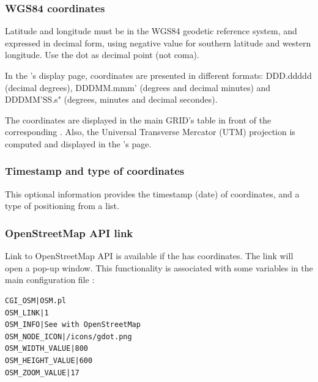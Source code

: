 \subsubsection{WGS84 coordinates}

Latitude and longitude must be in the WGS84 geodetic reference system, and expressed in decimal form, using negative value for southern latitude and western longitude. Use the dot as decimal point (not coma).

In the 's display page, coordinates are presented in different formats: DDD.ddddd (decimal degrees), DDD\degree MM.mmm' (degrees and decimal minutes) and DDD\degree MM'SS.s" (degrees, minutes and decimal secondes).

The coordinates are displayed in the main GRID's table in front of the corresponding . Also, the Universal Transverse Mercator (UTM) projection is computed and displayed in the 's page.

\subsubsection{Timestamp and type of coordinates}

This optional information provides the timestamp (date) of coordinates, and a type of positioning from a list.




\subsubsection{OpenStreetMap API link}

Link to OpenStreetMap API is available if the  has coordinates. The link will open a pop-up window. This functionality is associated with some variables in the main configuration file :

\begin{lstlisting}[title=\wofile{WEBOBS.rc} (excerpt)]
CGI_OSM|OSM.pl
OSM_LINK|1
OSM_INFO|See with OpenStreetMap
OSM_NODE_ICON|/icons/gdot.png
OSM_WIDTH_VALUE|800
OSM_HEIGHT_VALUE|600
OSM_ZOOM_VALUE|17
\end{lstlisting}

